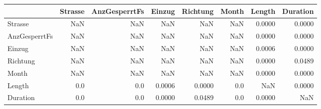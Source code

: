 \begin{tabular}{lrrrrrrr}
\toprule
{} &  Strasse &  AnzGesperrtFs &  Einzug &  Richtung &  Month &  Length &  Duration \\
\midrule
Strasse       &      NaN &            NaN &     NaN &       NaN &    NaN &  0.0000 &    0.0000 \\
AnzGesperrtFs &      NaN &            NaN &     NaN &       NaN &    NaN &  0.0000 &    0.0000 \\
Einzug        &      NaN &            NaN &     NaN &       NaN &    NaN &  0.0006 &    0.0000 \\
Richtung      &      NaN &            NaN &     NaN &       NaN &    NaN &  0.0000 &    0.0489 \\
Month         &      NaN &            NaN &     NaN &       NaN &    NaN &  0.0000 &    0.0000 \\
Length        &      0.0 &            0.0 &  0.0006 &    0.0000 &    0.0 &     NaN &    0.0000 \\
Duration      &      0.0 &            0.0 &  0.0000 &    0.0489 &    0.0 &  0.0000 &       NaN \\
\bottomrule
\end{tabular}
